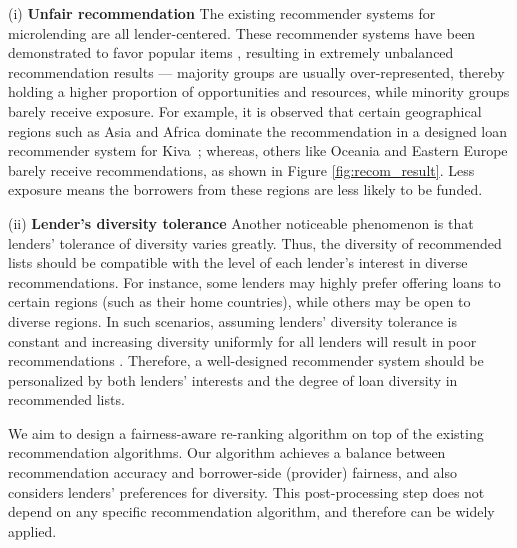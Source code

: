 
(i) \textbf{Unfair recommendation} The existing recommender systems for microlending are all lender-centered. These recommender systems have been demonstrated to favor popular items \cite{celma2008hits,lee2014fairness}, resulting in extremely unbalanced recommendation results --- majority groups are usually over-represented, thereby holding a higher proportion of opportunities and resources, while minority groups barely receive exposure. For example, it is observed that certain geographical regions such as Asia and Africa dominate the recommendation in a designed loan recommender system for Kiva~\cite{choo2014gather}; whereas, others like Oceania and Eastern Europe barely receive recommendations, as shown in Figure \ref{fig:recom_result}. Less exposure means the borrowers from these regions are less likely to be funded.


(ii) \textbf{Lender's diversity tolerance} Another noticeable phenomenon is that lenders' tolerance of diversity varies greatly.  Thus, the diversity of recommended lists should be compatible with the level of each lender's interest in diverse recommendations. For instance, some lenders may highly prefer offering loans to certain regions (such as their home countries), while others may be open to diverse regions. In such scenarios, assuming lenders' diversity tolerance is constant and increasing diversity uniformly for all lenders will result in poor recommendations \cite{eskandanian2017clustering}. Therefore, a well-designed recommender system should be personalized by both lenders' interests and the degree of loan diversity in recommended lists.

We aim to design a fairness-aware re-ranking algorithm on top of the existing recommendation algorithms. Our algorithm achieves a balance between recommendation accuracy and borrower-side (provider) fairness, and also considers lenders' preferences for diversity. This post-processing step does not depend on any specific recommendation algorithm, and therefore can be widely applied.


